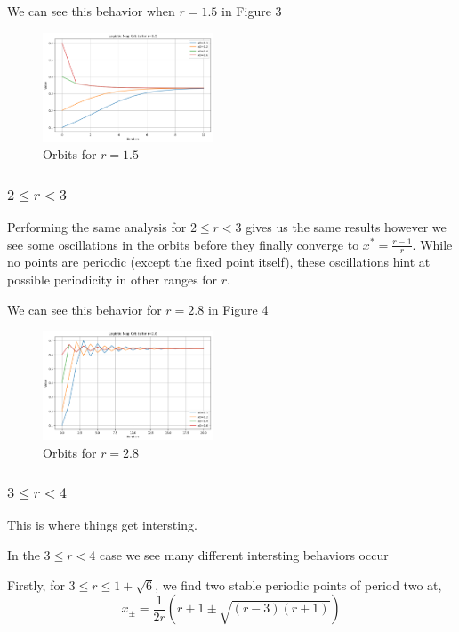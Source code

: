 \documentclass[11pt,twocolumn]{article}
\begin{document}
We can see this behavior when $r=1.5$ in Figure 3 

\begin{figure}
    \centering
\includegraphics[width=0.45\textwidth]{figures/1lesrles2.png}
    \caption{Orbits for $r=1.5$}
    \label{fig:enter-label}
\end{figure}

\subsubsection{$2\leq r<3$}
Performing the same analysis for $2\leq r < 3$ gives us the same results however we see some oscillations in the orbits before they finally converge to $x^\ast=\frac{r-1}{r}$.
While no points are periodic (except the fixed point itself), these oscillations hint at possible periodicity in other ranges for $r$.

We can see this behavior for $r=2.8$ in Figure 4

\begin{figure}
    \centering
\includegraphics[width=0.45\textwidth]{figures/2lesrles3.png}
    \caption{Orbits for $r=2.8$}
    \label{fig:enter-label}
\end{figure}
\subsubsection{$3\leq r<4$}
This is where things get intersting.

In the $3\leq r<4$ case we see many different intersting behaviors occur

Firstly, for $3\leq r\leq 1+\sqrt{6}$, we find two stable periodic points of period two at,
\begin{equation}
	x_\pm = \frac{1}{2r}(r+1\pm \sqrt{(r-3)(r+1)})
\end{equation}
\cite{TsuchiyaYamagishi}
\end{document}
